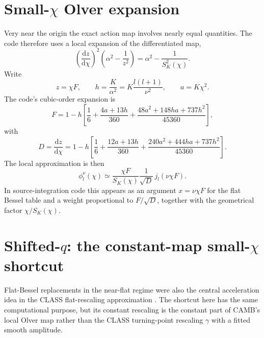 \documentclass[11pt,a4paper]{article}
\newcommand{\dd}{\mathrm{d}}
\newcommand{\SK}{S_K}
\begin{document}
\section{Small-\texorpdfstring{\(\chi\)}{chi} Olver expansion}

Very near the origin the exact action map involves nearly equal quantities.  The code therefore uses a local expansion of the differentiated map,
\begin{equation}
  \left(\frac{\dd z}{\dd\chi}\right)^2
  \left(\alpha^2-\frac{1}{z^2}\right)
  =\alpha^2-\frac{1}{\SK^2(\chi)}.
  \label{eq:differentiated-map}
\end{equation}
Write
\begin{equation}
  z=\chi F,\qquad
  h=\frac{K}{\alpha^2}=K\frac{l(l+1)}{\nu^2},\qquad
  a=K\chi^2.
\end{equation}
The code's cubic-order expansion is
\begin{equation}
  F=1-h\left[\frac{1}{6}+\frac{4a+13h}{360}
  +\frac{48a^2+148ha+737h^2}{45360}\right],
  \label{eq:F-smallchi}
\end{equation}
with
\begin{equation}
  D=\frac{\dd z}{\dd\chi}=1-h\left[\frac{1}{6}+\frac{12a+13h}{360}
  +\frac{240a^2+444ha+737h^2}{45360}\right].
  \label{eq:D-smallchi}
\end{equation}
The local approximation is then
\begin{equation}
  \phi_l^\nu(\chi)\simeq
  \frac{\chi F}{\SK(\chi)}\frac{1}{\sqrt D}\,j_l(\nu\chi F).
  \label{eq:smallchi-olver-phi}
\end{equation}
In source-integration code this appears as an argument \(x=\nu\chi F\) for the flat Bessel table and a weight proportional to \(F/\sqrt D\), together with the geometrical factor \(\chi/\SK(\chi)\).

\section{Shifted-\texorpdfstring{\(q\)}{q}: the constant-map small-\texorpdfstring{\(\chi\)}{chi} shortcut}

Flat-Bessel replacements in the near-flat regime were also the central acceleration idea in the \textsc{CLASS} flat-rescaling approximation \cite{lesgourgues-tram2013}.  The shortcut here has the same computational purpose, but its constant rescaling is the constant part of CAMB's local Olver map rather than the \textsc{CLASS} turning-point rescaling \(\gamma\) with a fitted smooth amplitude.
\end{document}
